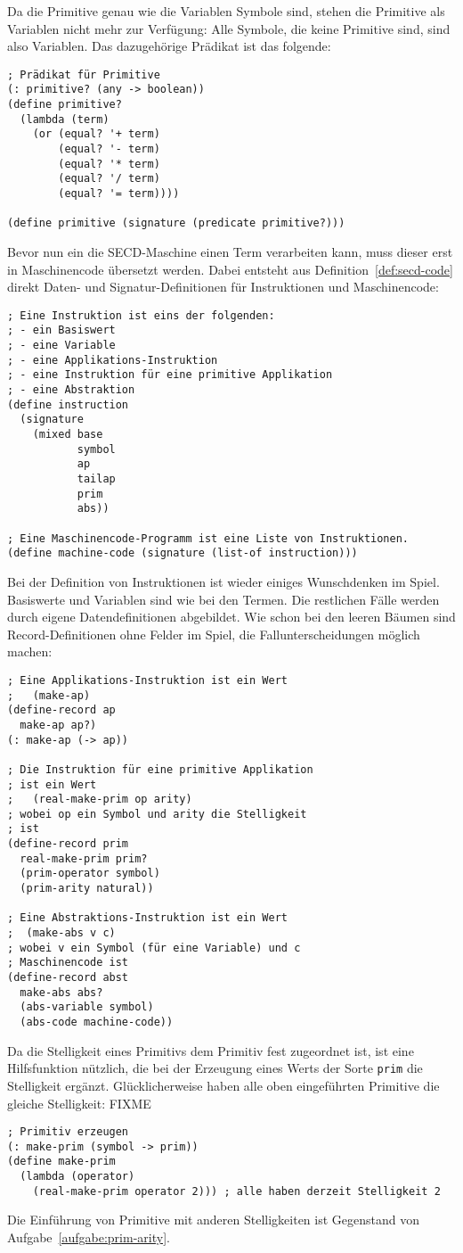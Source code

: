 %
Da die Primitive genau wie die Variablen Symbole sind, stehen die
Primitive als Variablen nicht mehr zur Verfügung:  Alle Symbole, die
keine Primitive sind, sind also Variablen.  Das dazugehörige Prädikat
ist das folgende:
%
\begin{lstlisting}
; Prädikat für Primitive
(: primitive? (any -> boolean))
(define primitive?
  (lambda (term)
    (or (equal? '+ term)
        (equal? '- term)
        (equal? '* term)
        (equal? '/ term)
        (equal? '= term))))

(define primitive (signature (predicate primitive?)))
\end{lstlisting}
%
Bevor nun ein die SECD-Maschine einen Term verarbeiten kann, muss
dieser erst in Maschinencode übersetzt werden.  Dabei entsteht aus
Definition~\ref{def:secd-code} direkt Daten- und Signatur-Definitionen
für Instruktionen und Maschinencode:
%
\begin{lstlisting}
; Eine Instruktion ist eins der folgenden:
; - ein Basiswert
; - eine Variable
; - eine Applikations-Instruktion
; - eine Instruktion für eine primitive Applikation
; - eine Abstraktion
(define instruction
  (signature
    (mixed base
           symbol
           ap
           tailap
           prim
           abs))

; Eine Maschinencode-Programm ist eine Liste von Instruktionen.
(define machine-code (signature (list-of instruction)))
\end{lstlisting}
%
Bei der Definition von Instruktionen ist wieder einiges Wunschdenken
im Spiel.  Basiswerte und Variablen sind wie bei den Termen.  Die
restlichen Fälle werden durch eigene Datendefinitionen abgebildet.
Wie schon bei den leeren Bäumen sind Record-Definitionen ohne Felder
im Spiel, die Fallunterscheidungen möglich machen:
%
\begin{lstlisting}
; Eine Applikations-Instruktion ist ein Wert
;   (make-ap)
(define-record ap
  make-ap ap?)
(: make-ap (-> ap))

; Die Instruktion für eine primitive Applikation
; ist ein Wert
;   (real-make-prim op arity)
; wobei op ein Symbol und arity die Stelligkeit
; ist
(define-record prim
  real-make-prim prim?
  (prim-operator symbol)
  (prim-arity natural))

; Eine Abstraktions-Instruktion ist ein Wert
;  (make-abs v c)
; wobei v ein Symbol (für eine Variable) und c
; Maschinencode ist
(define-record abst
  make-abs abs?
  (abs-variable symbol)
  (abs-code machine-code))
\end{lstlisting}
%
Da die Stelligkeit eines Primitivs dem Primitiv fest zugeordnet
ist, ist eine Hilfsfunktion nützlich, die bei der Erzeugung eines
Werts der Sorte \lstinline{prim} die Stelligkeit ergänzt.
Glücklicherweise haben alle oben eingeführten Primitive die gleiche
Stelligkeit:  FIXME
%
\begin{lstlisting}
; Primitiv erzeugen
(: make-prim (symbol -> prim))
(define make-prim
  (lambda (operator)
    (real-make-prim operator 2))) ; alle haben derzeit Stelligkeit 2
\end{lstlisting}
%
Die Einführung von Primitive mit anderen Stelligkeiten ist Gegenstand
von Aufgabe~\ref{aufgabe:prim-arity}.

